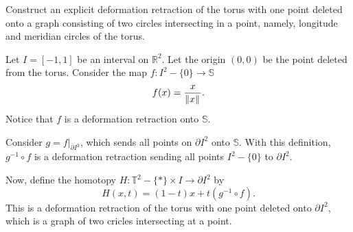 \question Construct an explicit deformation retraction of the torus with one 
point deleted onto a graph consisting of two circles intersecting in a point, 
namely, longitude and meridian circles of the torus.

\begin{solution}
Let $I = [-1, 1]$ be an interval on $\mathbb{R}^2$. Let the origin $(0,0)$ be
the point deleted from the torus. Consider the map $f: I^2 - \{0\} \rightarrow
\mathbb{S}$ \[f(x) = \frac{x}{\left\|{x}\right\|_{{}_{}}}.\] Notice that $f$ is a deformation 
retraction onto $\mathbb{S}$.

Consider $g = f\rvert_{\partial I^2}$, which sends all points on $\partial I^2$
onto $\mathbb{S}$. With this definition, $g^{-1} \circ f$ is a deformation
retraction sending all points $I^2 - \{0\}$ to $\partial I^2$.

Now, define the homotopy $H: \mathbb{T}^2 - \{*\} \times I \rightarrow \partial
I^2$ by \[ H(x,t) = (1-t)x + t(g^{-1} \circ f). \] This is a deformation
retraction of the torus with one point deleted onto $\partial I^2$, which is a
graph of two cricles intersecting at a point.

\end{solution}